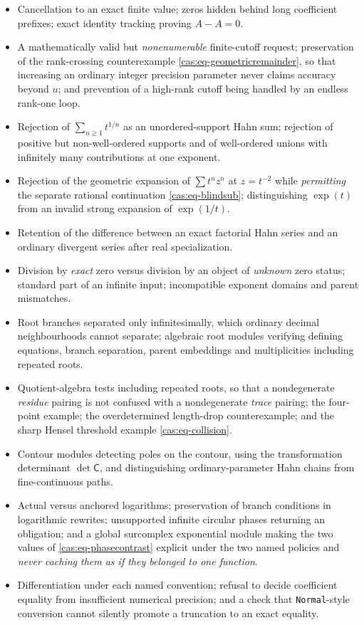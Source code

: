 \documentclass[11pt,letterpaper]{article}
\numberwithin{equation}{section}
\theoremstyle{definition}
\theoremstyle{remark}
\begin{document}
\begin{itemize}
\item Cancellation to an exact finite value; zeros hidden behind long
coefficient prefixes; exact identity tracking proving $A-A=0$.
\item A mathematically valid but \emph{nonenumerable} finite-cutoff request;
preservation of the rank-crossing counterexample
\eqref{cas:eq-geometricremainder}, so that increasing an ordinary integer
precision parameter never claims accuracy beyond $u$; and prevention of a
high-rank cutoff being handled by an endless rank-one loop.
\item Rejection of $\sum_{n\ge1}t^{1/n}$ as an unordered-support Hahn sum;
rejection of positive but non-well-ordered supports and of well-ordered unions
with infinitely many contributions at one exponent.
\item Rejection of the geometric expansion of $\sum t^nz^n$ at $z=t^{-2}$ while
\emph{permitting} the separate rational continuation \eqref{cas:eq-blindsub};
distinguishing $\exp(t)$ from an invalid strong expansion of $\exp(1/t)$.
\item Retention of the difference between an exact factorial Hahn series and an
ordinary divergent series after real specialization.
\item Division by \emph{exact} zero versus division by an object of
\emph{unknown} zero status; standard part of an infinite input; incompatible
exponent domains and parent mismatches.
\item Root branches separated only infinitesimally, which ordinary decimal
neighbourhoods cannot separate; algebraic root modules verifying defining
equations, branch separation, parent embeddings and multiplicities including
repeated roots.
\item Quotient-algebra tests including repeated roots, so that a nondegenerate
\emph{residue} pairing is not confused with a nondegenerate \emph{trace}
pairing; the four-point example; the overdetermined length-drop counterexample;
and the sharp Hensel threshold example \eqref{cas:eq-collision}.
\item Contour modules detecting poles on the contour, using the transformation
determinant $\det\mathsf C$, and distinguishing ordinary-parameter Hahn chains
from fine-continuous paths.
\item Actual versus anchored logarithms; preservation of branch conditions in
logarithmic rewrites; unsupported infinite circular phases returning an
obligation; and a global surcomplex exponential module making the two values of
\eqref{cas:eq-phasecontrast} explicit under the two named policies and
\emph{never caching them as if they belonged to one function}.
\item Differentiation under each named convention; refusal to decide coefficient
equality from insufficient numerical precision; and a check that
\texttt{Normal}-style conversion cannot silently promote a truncation to an
exact equality.
\end{itemize}
\end{document}
